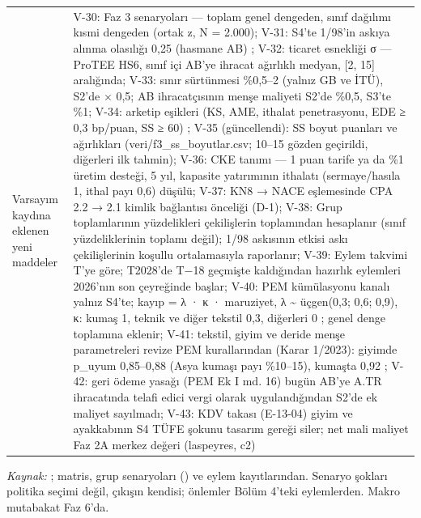\begin{longtable}[]{@{}
  >{\raggedright\arraybackslash}p{}
  >{\raggedright\arraybackslash}p{}@{}}
Varsayım kaydına eklenen yeni maddeler & V-30: Faz 3 senaryoları --- toplam genel dengeden, sınıf dağılımı kısmi dengeden (ortak z, N = 2.000); V-31: S4'te 1/98'in askıya alınma olasılığı 0,25 (hasmane AB) \etiketH{}; V-32: ticaret esnekliği σ --- ProTEE HS6, sınıf içi AB'ye ihracat ağırlıklı medyan, {[}2, 15{]} aralığında; V-33: sınır sürtünmesi \%0,5--2 (yalnız GB ve İTÜ), S2'de × 0,5; AB ihracatçısının menşe maliyeti S2'de \%0,5, S3'te \%1; V-34: arketip eşikleri (KS, AME, ithalat penetrasyonu, EDE ≥ 0,3 bp/puan, SS ≥ 60) \etiketH{}; V-35 (güncellendi): SS boyut puanları ve ağırlıkları \etiketH{} (veri/f3\_ss\_boyutlar.csv; 10--15 gözden geçirildi, diğerleri ilk tahmin); V-36: CKE tanımı --- 1 puan tarife ya da \%1 üretim desteği, 5 yıl, kapasite yatırımının ithalatı (sermaye/hasıla 1, ithal payı 0,6) düşülü; V-37: KN8 → NACE eşlemesinde CPA 2.2 → 2.1 kimlik bağlantısı önceliği (D-1); V-38: Grup toplamlarının yüzdelikleri çekilişlerin toplamından hesaplanır (sınıf yüzdeliklerinin toplamı değil); 1/98 askısının etkisi askı çekilişlerinin koşullu ortalamasıyla raporlanır; V-39: Eylem takvimi T'ye göre; T2028'de T−18 geçmişte kaldığından hazırlık eylemleri 2026'nın son çeyreğinde başlar; V-40: PEM kümülasyonu kanalı yalnız S4'te; kayıp = λ · κ · maruziyet, λ \textasciitilde{} üçgen(0,3; 0,6; 0,9), κ: kumaş 1, teknik ve diğer tekstil 0,3, diğerleri 0 \etiketH{}; genel denge toplamına eklenir; V-41: tekstil, giyim ve deride menşe parametreleri revize PEM kurallarından (Karar 1/2023): giyimde p\_uyum 0,85--0,88 (Asya kumaşı payı \%10--15), kumaşta 0,92 \etiketH{}; V-42: geri ödeme yasağı (PEM Ek I md. 16) bugün AB'ye A.TR ihracatında telafi edici vergi olarak uygulandığından S2'de ek maliyet sayılmadı; V-43: KDV takası (E-13-04) giyim ve ayakkabının S4 TÜFE şokunu tasarım gereği siler; net mali maliyet Faz 2A merkez değeri (laspeyres, c2) \\
\end{longtable}

\endgroup

\emph{Kaynak:} ; matris, grup senaryoları () ve eylem kayıtlarından. Senaryo şokları politika seçimi değil, çıkışın kendisi; önlemler Bölüm 4'teki eylemlerden. Makro mutabakat Faz 6'da.

